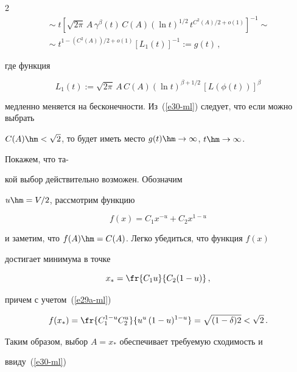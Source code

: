 \begin{multicols}{2}
\begin{multline}
{}\sim t \left[\sqrt{2\pi}\,A\,\gamma^\beta(t) \, C(A)\left(\ln t\right)^{1/2}\, t^{C^2(A)/2+o(1)}\right]^{-1}\sim{}\\


{}\sim t^{1-({C^2(A)})/{2}+o(1)}\left[L_1(t)\right]^{-1}:=g(t)\,,\label{e30-ml}


\end{multline}


где функция


$$


L_1(t):=\sqrt{2\pi}\,A\, C(A)(\ln t)^{\beta+1/2}\,[L(\phi(t))]^\beta


$$  


медленно меняется на бесконечности. Из~(\ref{e30-ml}) следует, что  если можно выбрать


$C(A)\hm<\sqrt{2}$, то будет иметь место  $g(t)\hm\to \infty$, $t\hm\to \infty$. 


Покажем, что та-\linebreak\vspace*{-12pt}





\pagebreak





\noindent


кой выбор  действительно возможен. Обозначим


$u\hm=V/2$, рассмотрим функцию


\begin{equation*}


f(x)=C_1 x^{-u}+C_2 x^{1-u} %


\end{equation*}


и заметим, что $f(A)\hm=C(A)$. Легко убедиться, что функция $f(x)$


достигает минимума в точке


$$


x_*=\fr{C_1 u}{C_2(1-u)}\,,


$$


причем с учетом~(\ref{e29a-ml})


$$


f(x_*)=\fr{C_1^{1-u}C_2^u}{u^u\,(1-u)^{1-u}}=\sqrt{(1-\delta)2}<\sqrt{2}\,.


$$


Таким образом, выбор $A=x_*$ обеспечивает требуемую сходимость и


 ввиду~(\ref{e30-ml})



\end{multicols}
